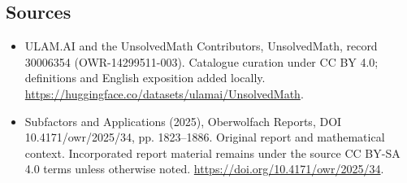 \documentclass[11pt]{article}
\begin{document}
\subsection{Sources}
\begin{itemize}
\item[\hypertarget{source:30006354:1}{S1}] ULAM.AI and the UnsolvedMath Contributors, UnsolvedMath, record 30006354 (OWR-14299511-003). Catalogue curation under CC BY 4.0; definitions and English exposition added locally.
\url{https://huggingface.co/datasets/ulamai/UnsolvedMath}.
\item[\hypertarget{source:30006354:2}{S2}] Subfactors and Applications (2025), Oberwolfach Reports, DOI 10.4171/owr/2025/34, pp. 1823--1886. Original report and mathematical context. Incorporated report material remains under the source CC BY-SA 4.0 terms unless otherwise noted.
\url{https://doi.org/10.4171/owr/2025/34}.
\end{itemize}
\label{end:30006354}
\end{document}
